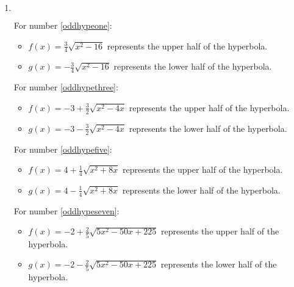 \begin{enumerate}
\setcounter{enumi}{\value{HW}}

\item $~$


For number \ref{oddhypeone}:

\begin{itemize}

\item  $f(x) = \frac{3}{4} \sqrt{x^2-16}$ represents the upper half of the hyperbola.

\item  $g(x) =  -\frac{3}{4} \sqrt{x^2-16}$ represents the lower half of the hyperbola.

\end{itemize}

For number \ref{oddhypethree}:

\begin{itemize}

\item  $f(x) = -3 + \frac{3}{2} \sqrt{x^2-4x} $ represents the upper half of the hyperbola.

\item  $g(x) = -3 -  \frac{3}{2} \sqrt{x^2-4x} $ represents the lower half of the hyperbola.

\end{itemize}
For number \ref{oddhypefive}:

\begin{itemize}

\item  $f(x) = 4 + \frac{1}{4} \sqrt{x^2+8x} $ represents the upper half of the hyperbola.

\item  $g(x) = 4 - \frac{1}{4} \sqrt{x^2+8x}  $ represents the lower half of the hyperbola.

\end{itemize}


For number \ref{oddhypeseven}:

\begin{itemize}

\item  $f(x) = -2 + \frac{2}{5} \sqrt{5x^2-50x+225}$ represents the upper half of the hyperbola.

\item  $g(x) =-2 - \frac{2}{5} \sqrt{5x^2-50x+225}$ represents the lower half of the hyperbola.

\end{itemize}


\end{enumerate}
